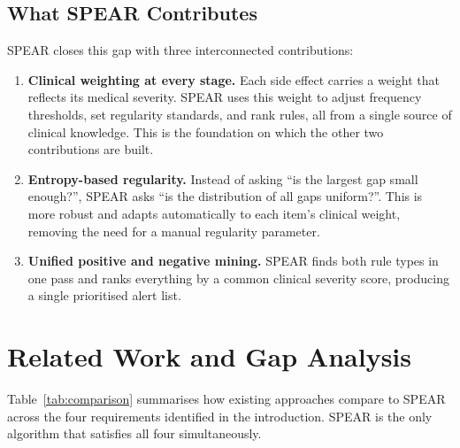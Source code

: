 \documentclass[10pt,twocolumn]{article}
\begin{document}
\subsection{What SPEAR Contributes}

SPEAR closes this gap with three interconnected contributions:

\begin{enumerate}[leftmargin=*]
  \item \textbf{Clinical weighting at every stage.}
        Each side effect carries a weight that reflects its medical
        severity. SPEAR uses this weight to adjust frequency
        thresholds, set regularity standards, and rank rules, all
        from a single source of clinical knowledge. This is the
        foundation on which the other two contributions are built.

  \item \textbf{Entropy-based regularity.}
        Instead of asking ``is the largest gap small enough?'', SPEAR
        asks ``is the distribution of all gaps uniform?''. This is
        more robust and adapts automatically to each item's clinical
        weight, removing the need for a manual regularity parameter.

  \item \textbf{Unified positive and negative mining.}
        SPEAR finds both rule types in one pass and ranks everything
        by a common clinical severity score, producing a single
        prioritised alert list.
\end{enumerate}

\section{Related Work and Gap Analysis}
\label{sec:related}

Table~\ref{tab:comparison} summarises how existing approaches compare
to SPEAR across the four requirements identified in the introduction.
SPEAR is the only algorithm that satisfies all four simultaneously.
\end{document}

